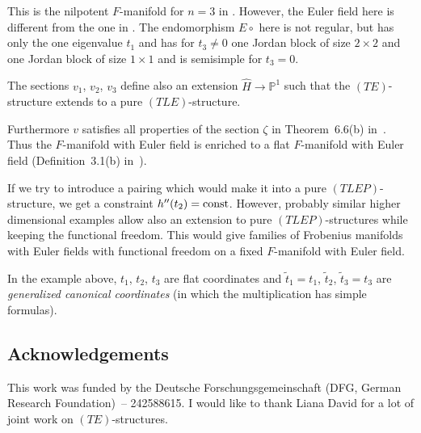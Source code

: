 \documentclass[pdftex]{sigma}%
\numberwithin{equation}{section}
\numberwithin{figure}{section}
\renewcommand{\P}{{\mathbb P}}
\newcommand{\www}{\widetilde}
\newcommand{\wwh}{\widehat}
\begin{document}
This is the nilpotent $F$-manifold for $n=3$ in
\cite[Theorem~3]{DH17}.
However, the Euler field here is different from the one in
\cite[Theorem~3]{DH17}. The endomorphism $E\circ$ here is not
regular, but has only the one eigenvalue $t_1$ and
has for $t_3\neq 0$ one Jordan block of size
$2\times 2$ and one Jordan block of size $1\times 1$
and is semisimple for $t_3=0$.

The sections $v_1$, $v_2$, $v_3$ define also an
extension $\wwh{H}\to\P^1$ such that the $(TE)$-structure
extends to a pure $(TLE)$-structure.

Furthermore $v$ satisfies all properties of the
section $\zeta$ in Theorem~6.6(b) in~\cite{DH20-2}.
Thus the $F$-manifold with Euler field is enriched to a
flat $F$-manifold with Euler field (Definition~3.1(b) in~\cite{DH20-2}).

If we try to introduce a pairing which would make it
into a pure $(TLEP)$-structure, we get a constraint
$h''(t_2)={\rm const}$. However, probably similar higher dimensional
examples allow also an extension to pure $(TLEP)$-structures
while keeping the functional freedom.
This would give families of Frobenius manifolds with
Euler fields with functional freedom on a fixed $F$-manifold
with Euler field.

In the example above, $t_1$, $t_2$, $t_3$ are flat coordinates
and $\www t_1=t_1$, $\www t_2$, $\www t_3=t_3$ are
{\it generalized canonical coordinates}
(in which the multiplication has simple formulas).

\subsection*{Acknowledgements}

This work was funded by the Deutsche Forschungsgemeinschaft (DFG, German Research Foundation)~-- 242588615. I would like to thank Liana David for a lot of joint work on $(TE)$-structures.
\end{document}
